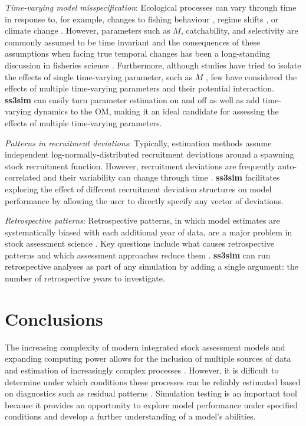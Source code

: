 \documentclass[10pt]{article}
\begin{document}
\emph{Time-varying model misspecification}: Ecological processes can vary
through time in response to, for example, changes to fishing behaviour
\cite{hilborn1992}, regime shifts \cite{vert-pre2013}, or climate change
\cite{walther2002}. However, parameters such as $M$, catchability, and
selectivity are commonly assumed to be time invariant and the consequences of
these assumptions when facing true temporal changes has been a long-standing
discussion in fisheries science \cite{royama1992, wilberg2006, fu2001}.
Furthermore, although studies have tried to isolate the effects of single
time-varying parameter, such as $M$ \cite{lee2011, jiao2012, deroba2013,
  johnson2014}, few have considered the effects of multiple time-varying
parameters and their potential interaction. \textbf{ss3sim} can easily turn
parameter estimation on and off as well as add time-varying dynamics to the OM,
making it an ideal candidate for assessing the effects of multiple time-varying
parameters.

\emph{Patterns in recruitment deviations}: Typically, estimation methods assume
independent log-normally-distributed recruitment deviations around a spawning
stock recruitment function. However, recruitment deviations are frequently
auto-correlated and their variability can change through time
\cite{beamish1995, pyper1998}. \textbf{ss3sim} facilitates exploring the
effect of different recruitment deviation structures on model performance by
allowing the user to directly specify any vector of deviations.

\emph{Retrospective patterns}: Retrospective patterns, in which model estimates
are systematically biased with each additional year of data, are a major
problem in stock assessment science \cite{mohn1999, legault2008}. Key questions
include what causes retrospective patterns and which assessment approaches reduce
them \cite{legault2008}. \textbf{ss3sim} can run retrospective analyses as part
of any simulation by adding a single argument: the number of retrospective
years to investigate.

\section*{Conclusions}

The increasing complexity of modern integrated stock assessment models and
expanding computing power allows for the inclusion of multiple sources of data
and estimation of increasingly complex processes \cite{maunder2013}. However,
it is difficult to determine under which conditions these processes can be
reliably estimated based on diagnostics such as residual patterns
\cite{maunder2013}. Simulation testing is an important tool because it provides
an opportunity to explore model performance under specified conditions and
develop a further understanding of a model's abilities.
\end{document}

